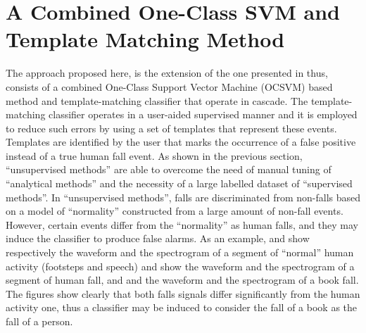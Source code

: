 \section[A Combined OCSVM and Template Matching User-Aided Approach]{A Combined One-Class SVM and Template Matching Method}
\label{sec:user_aided_cin}

The approach proposed here, is the extension of the one presented in  thus, consists of a combined One-Class Support Vector Machine (OCSVM) based method and template-matching classifier that operate in cascade. The template-matching classifier operates in a user-aided supervised manner and it is employed to reduce such errors by using a set of templates that represent these events. Templates are identified by the user that marks the occurrence of a false positive instead of a true human fall event. 
As shown in the previous section, ``unsupervised methods'' are able to overcome the need of manual tuning of ``analytical methods'' and the necessity of a large labelled dataset of ``supervised methods''. In ``unsupervised methods'', falls are discriminated from non-falls based on a model of ``normality'' constructed from a large amount of non-fall events. However, certain events differ from the ``normality'' as human falls, and they may induce the classifier to produce false alarms. As an example,  and  show respectively the waveform and the spectrogram of a segment of ``normal'' human activity (footsteps and speech)  and  show the waveform and the spectrogram of a segment of human fall, and  and  the waveform and the spectrogram of a book fall. The figures show clearly that both falls signals differ significantly from the human activity one, thus a classifier may be induced to consider the fall of a book as the fall of a person.

